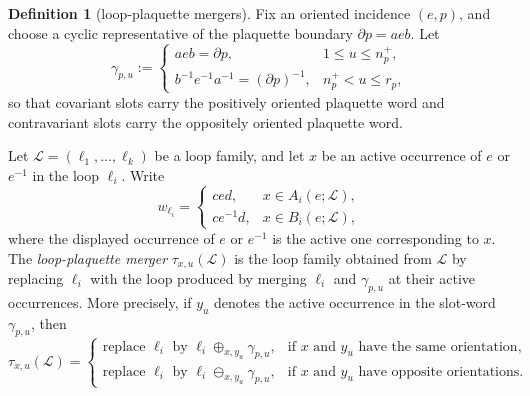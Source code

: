 \documentclass[11pt,a4paper,reqno]{article}
\theoremstyle{definition}
\newtheorem{definition}[theorem]{Definition}
\theoremstyle{remark}
\newcommand\Lc{{\mathcal{L}}}
\begin{document}
\begin{definition}[loop-plaquette mergers]
Fix an oriented incidence $(e,p)$, and choose a cyclic representative of the plaquette boundary $\partial p = aeb.$ Let
\[
\gamma_{p,u}:=\begin{cases}
aeb=\partial p, & 1\le u\le n_p^+,\\[1mm]
b^{-1}e^{-1}a^{-1}=(\partial p)^{-1}, & n_p^+<u\le r_p,
\end{cases}
\]
so that covariant slots carry the positively oriented plaquette word and contravariant slots carry the oppositely oriented plaquette word.

Let $\Lc=(\ell_1,\dots,\ell_k)$ be a loop family, and let $x$ be an active occurrence of $e$ or $e^{-1}$ in the loop $\ell_i$. Write
\[
w_{\ell_i}=
\begin{cases}
ced, & x\in A_i(e;\Lc),\\
ce^{-1}d, & x\in B_i(e;\Lc),
\end{cases}
\]
where the displayed occurrence of $e$ or $e^{-1}$ is the active one corresponding to $x$. The \emph{loop-plaquette merger} $\tau_{x,u}(\Lc)$ is the loop family obtained from $\Lc$ by replacing $\ell_i$ with the loop produced by merging $\ell_i$ and $\gamma_{p,u}$ at their active occurrences. More precisely, if $y_u$ denotes the active occurrence in the slot-word $\gamma_{p,u}$, then
\[
\tau_{x,u}(\Lc)=\begin{cases}
\text{replace }\ell_i\text{ by }\ell_i\oplus_{x,y_u}\gamma_{p,u},
& \text{if }x\text{ and }y_u\text{ have the same orientation},\\
\text{replace }\ell_i\text{ by }\ell_i\ominus_{x,y_u}\gamma_{p,u},
& \text{if }x\text{ and }y_u\text{ have opposite orientations}.
\end{cases}
\]
\end{definition}
\end{document}
